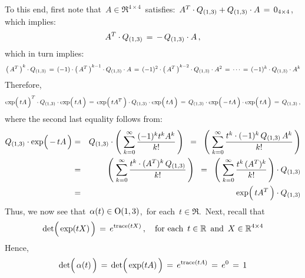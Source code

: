 \vskip 0.2cm
\noindent
To this end, first note that \,$A \in \Re^{4 \times 4}$\, satisfies:
\,$A^{T} \cdot Q_{(1,3)} + Q_{(1,3)} \cdot A \,=\, 0_{4 \times 4}$,\,
which implies:
\begin{equation*}
A^{T} \cdot Q_{(1,3)} \,=\, -\,Q_{(1,3)} \cdot A\,,
\end{equation*}
which in turn implies:
\begin{equation*}
\left(\,A^{T}\,\right)^{k} \cdot Q_{(1,3)}
\,=\,
	(-1) \cdot \left(\,A^{T}\,\right)^{k-1} \cdot Q_{(1,3)} \cdot A
\,=\,
	(-1)^{2} \cdot \left(\,A^{T}\,\right)^{k-2} \cdot Q_{(1,3)} \cdot A^{2}
\,=\,
	\cdots
\,=\,
	(-1)^{k} \cdot Q_{(1,3)} \cdot A^{k}
\end{equation*}
Therefore,
\begin{equation*}
\exp\!\left(\,t\overset{{\color{white}.}}{A}\,\right)^{T} \cdot \Qot \cdot \exp\!\left(\,t\overset{{\color{white}.}}{A}\,\right)
\,=\,
	\exp\!\left(\,\overset{{\color{white}.}}{t}A^{T}\,\right) \cdot \Qot \cdot \exp\!\left(\,t\overset{{\color{white}.}}{A}\,\right)
\,=\,
	\Qot \cdot \exp\!\left(\,-\,\overset{{\color{white}.}}{t}A\,\right) \cdot \exp\!\left(\,t\overset{{\color{white}.}}{A}\,\right)
\,=\,
	\Qot\,,
\end{equation*}
where the second last equality follows from:
\begin{eqnarray*}
\Qot \cdot \exp\!\left(\,-\,\overset{{\color{white}.}}{t}A\,\right)
& = &
	\Qot \cdot \left(\;\overset{\infty}{\underset{k=0}{\sum}}\,\dfrac{(-1)^{k}t^{k}A^{k}}{k!}\,\right)
\;\; = \;\;
	\left(\;\overset{\infty}{\underset{k=0}{\sum}}\,\dfrac{t^{k}\cdot(-1)^{k}\,\Qot\,A^{k}}{k!}\,\right)
\\
& = &
	\left(\;\overset{\infty}{\underset{k=0}{\sum}}\,\dfrac{t^{k}\cdot(A^{T})^{k}\,\Qot}{k!}\,\right)
\;\; = \;\;
	\left(\;\overset{\infty}{\underset{k=0}{\sum}}\,\dfrac{t^{k}\,(A^{T})^{k}}{k!}\,\right)
	\cdot\Qot
\\
& = &
	\exp\!\left(\,\overset{{\color{white}.}}{t}A^{T}\,\right) \cdot \Qot
\end{eqnarray*}
Thus, we now see that
\,$\alpha(t) \in \textnormal{O}(1,3)$,\, for each \,$t \in \Re$.\,
Next, recall that
\begin{equation*}
\det\!\left(\,\exp(t\overset{{\color{white}.}}{X})\,\right)
\,=\,
	e^{\trace(tX)}\,,
\quad
\textnormal{for each \,$t \in \Re$\, and \,$X \in \Re^{4 \times 4}$}
\end{equation*}
Hence,
\begin{equation*}
\det\!\left(\, \alpha(\overset{{\color{white}.}}{t}) \,\right)
\,=\,
	\det\!\left(\,\exp(t\overset{{\color{white}.}}{A})\,\right)
\,=\,
	e^{\trace(tA)}
\,=\,
	e^{0}
\,=\,
	1
\end{equation*}
